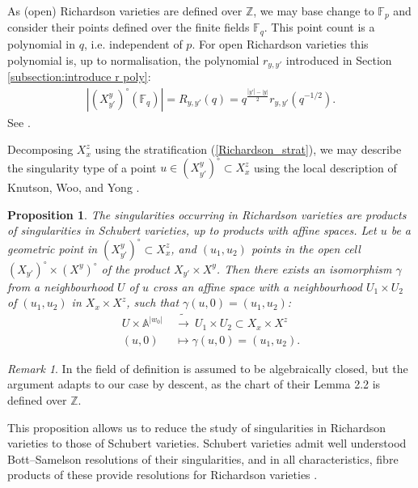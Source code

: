 \documentclass[11pt]{article}
\newtheorem{prop}[thm]{Proposition}
\theoremstyle{remark}
\newtheorem{rem}[thm]{Remark}
\theoremstyle{definition}
\begin{document}
	As (open) Richardson varieties are defined over $\mathbb{Z}$, we may base change to $\mathbb{F}_p$ and consider their points defined over the finite fields $\mathbb{F}_q$. 
	This point count is a polynomial in $q$, i.e.
	independent of $p$. For	open Richardson varieties this polynomial is, up to normalisation, the polynomial $r_{y,y'}$  introduced in Section \ref{subsection:introduce r poly}:
	\begin{align}
		|(X^y_{y'})^\circ(\mathbb{F}_q)|
		=
		R_{y,y'}(q)
		=
		q^{\frac{|y'|-|y|}{2}}
		r_{y,y'}(q^{-1/2}).
	\end{align}
    See \cite[\S A]{KL79}.
    \\
    \par 
	Decomposing $X^z_x$ using the stratification (\ref{Richardson_strat}), we may describe the singularity type of a point $u\in (X^y_{y'})^\circ\subset X^z_x$ using the local description of Knutson, Woo, and Yong \cite[\S1]{KWY13}.
	\begin{prop}
\label{Richardson_link}
	The singularities occurring in Richardson varieties are products of singularities in Schubert varieties, up to products with affine spaces. 
	Let $u$ be a geometric point in $(X^y_{y'})^\circ\subset X^z_x$, and $(u_1,u_2)$ points in the open cell $(X_{y'})^\circ\times (X^y)^\circ$ of the product $X_{y'}\times X^y$. 
	Then there exists an isomorphism $\gamma$ from a neighbourhood $U$ of $u$ cross an affine space with a neighbourhood $U_1\times U_2$ of $(u_1,u_2)$ in $X_x\times X^z$, such that $\gamma(u,0)=(u_1,u_2)$:
	\begin{align*}
    	U\times \mathbb{A}^{|w_0|}~ &\tilde{\longrightarrow} ~ U_1\times U_2\subset X_x\times X^z\\
    	(u,0)~ &\! \longmapsto \gamma(u,0)=(u_1,u_2).
	\end{align*}
	\end{prop}
\begin{rem}
In \cite{KWY13} the field of definition is assumed to be algebraically closed, but the argument adapts to our case by descent, as the chart of their Lemma 2.2 is defined over $\mathbb{Z}$.
\end{rem}

This proposition allows us to reduce the study of singularities in Richardson varieties to those of Schubert varieties. Schubert varieties admit well understood Bott--Samelson resolutions of their singularities, and in all characteristics, fibre products of these provide resolutions for Richardson varieties \cite[\S A]{KLS14}.
\end{document}
